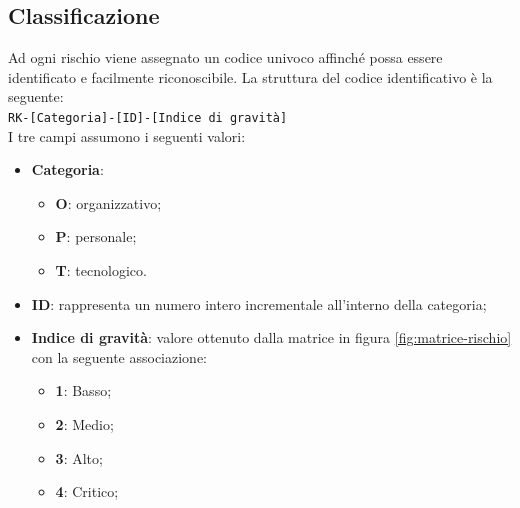 \documentclass[../piano-di-progetto.tex]{subfiles}
\begin{document}
\subsection{Classificazione}
Ad ogni rischio viene assegnato un codice univoco affinché possa essere identificato e facilmente riconoscibile. La struttura del codice identificativo è la seguente: \\
\texttt{RK-[Categoria]-[ID]-[Indice di gravità]} \\
I tre campi assumono i seguenti valori:
\begin{itemize}
    \item \textbf{Categoria}:
        \begin{itemize}
            \item \textbf{O}: organizzativo;
            \item \textbf{P}: personale;
            \item \textbf{T}: tecnologico.
        \end{itemize}
    \item \textbf{ID}: rappresenta un numero intero incrementale all'interno della categoria;
    \item \textbf{Indice di gravità}: valore ottenuto dalla matrice in figura \ref{fig:matrice-rischio} con la seguente associazione:
        \begin{itemize}
            \item \textbf{1}: Basso;
            \item \textbf{2}: Medio;
            \item \textbf{3}: Alto;
            \item \textbf{4}: Critico;
        \end{itemize}
\end{itemize}
\end{document}
